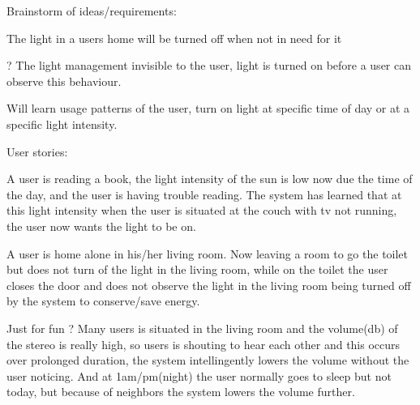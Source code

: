 
Brainstorm of ideas/requirements:

The light in a users home will be turned off when not in need for it

? The light management invisible to the user, light is turned on before a user can observe this behaviour.

Will learn usage patterns of the user, turn on light at specific time of day or at a specific light intensity.

User stories:

A user is reading a book, the light intensity of the sun is low now due the time of the day, and the user is having trouble reading. The system has learned that at this light intensity when the user is situated at the couch with tv not running, the user now wants the light to be on.

A user is home alone in his/her living room. Now leaving a room to go the toilet but does not turn of the light in the living room, while on the toilet the user closes the door and does not observe the light in the living room being turned off by the system to conserve/save energy.

Just for fun ? Many users is situated in the living room and the volume(db) of the stereo is really high, so users is shouting to hear each other and this occurs over prolonged duration, the system intellingently lowers the volume without the user noticing. And at 1am/pm(night) the user normally goes to sleep but not today, but because of neighbors the system lowers the volume further.
